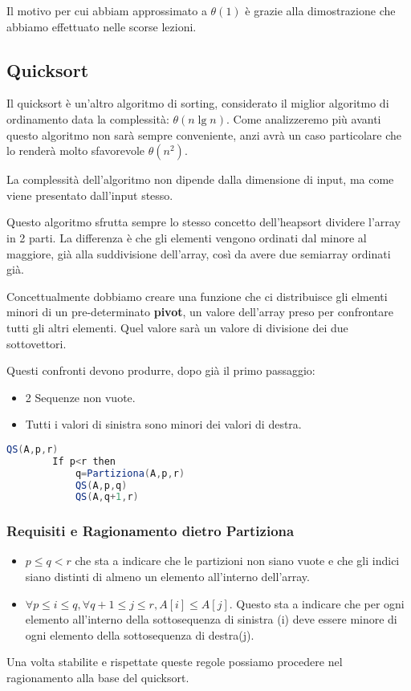 Il motivo per cui abbiam approssimato a $\theta(1)$ è grazie alla dimostrazione che abbiamo effettuato nelle scorse lezioni.
\subsection{Quicksort}
Il quicksort è un'altro algoritmo di sorting, considerato il miglior algoritmo di ordinamento data la complessità: $\theta(n\lg n)$. Come analizzeremo più avanti questo algoritmo non sarà sempre conveniente, anzi avrà un caso particolare che lo renderà molto sfavorevole $\theta(n^2)$.\medskip

La complessità dell'algoritmo non dipende dalla dimensione di input, ma come viene presentato dall'input stesso.\smallskip

Questo algoritmo sfrutta sempre lo stesso concetto dell'heapsort dividere l'array in 2 parti. La differenza è che gli elementi vengono ordinati dal minore al maggiore, già alla suddivisione dell'array, così da avere due semiarray ordinati già.\bigskip


Concettualmente dobbiamo creare una funzione che ci distribuisce gli elmenti minori di un pre-determinato \textbf{pivot}, un valore dell'array preso per confrontare tutti gli altri elementi. Quel valore sarà un valore di divisione dei due sottovettori.\medskip

Questi confronti devono produrre, dopo già il primo passaggio:
\begin{itemize}
    \item 2 Sequenze non vuote.
    \item Tutti i valori di sinistra sono minori dei valori di destra.
\end{itemize}

\begin{lstlisting}[language=Java]
    QS(A,p,r)
        If p<r then
            q=Partiziona(A,p,r)
            QS(A,p,q)
            QS(A,q+1,r)
\end{lstlisting}

\subsubsection{Requisiti e Ragionamento dietro Partiziona}
\begin{itemize}
    \item $p\le q < r$ che sta a indicare che le partizioni non siano vuote e che gli indici siano distinti di almeno un elemento all'interno dell'array.
    \item $\forall p\le i \le q, \forall q+1 \le j \le r, A[i]\le A[j]$. Questo sta a indicare che per ogni elemento all'interno della sottosequenza di sinistra (i) deve essere minore di ogni elemento della sottosequenza di destra(j).
\end{itemize}
Una volta stabilite e rispettate queste regole possiamo procedere nel ragionamento alla base del quicksort.
